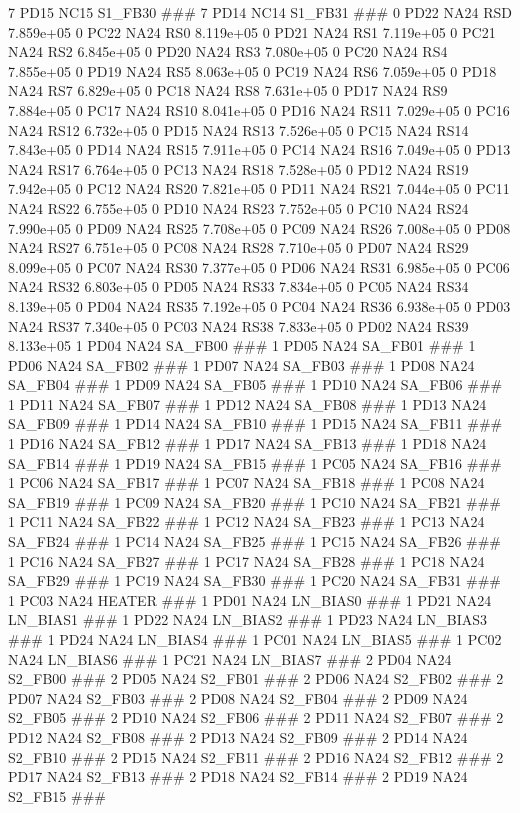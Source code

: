 7 PD15 NC15 S1_FB30 ### 
7 PD14 NC14 S1_FB31 ### 
0 PD22 NA24 RSD 7.859e+05 
0 PC22 NA24 RS0 8.119e+05 
0 PD21 NA24 RS1 7.119e+05 
0 PC21 NA24 RS2 6.845e+05 
0 PD20 NA24 RS3 7.080e+05 
0 PC20 NA24 RS4 7.855e+05 
0 PD19 NA24 RS5 8.063e+05 
0 PC19 NA24 RS6 7.059e+05 
0 PD18 NA24 RS7 6.829e+05 
0 PC18 NA24 RS8 7.631e+05 
0 PD17 NA24 RS9 7.884e+05 
0 PC17 NA24 RS10 8.041e+05 
0 PD16 NA24 RS11 7.029e+05 
0 PC16 NA24 RS12 6.732e+05 
0 PD15 NA24 RS13 7.526e+05 
0 PC15 NA24 RS14 7.843e+05 
0 PD14 NA24 RS15 7.911e+05 
0 PC14 NA24 RS16 7.049e+05 
0 PD13 NA24 RS17 6.764e+05 
0 PC13 NA24 RS18 7.528e+05 
0 PD12 NA24 RS19 7.942e+05 
0 PC12 NA24 RS20 7.821e+05 
0 PD11 NA24 RS21 7.044e+05 
0 PC11 NA24 RS22 6.755e+05 
0 PD10 NA24 RS23 7.752e+05 
0 PC10 NA24 RS24 7.990e+05 
0 PD09 NA24 RS25 7.708e+05 
0 PC09 NA24 RS26 7.008e+05 
0 PD08 NA24 RS27 6.751e+05 
0 PC08 NA24 RS28 7.710e+05 
0 PD07 NA24 RS29 8.099e+05 
0 PC07 NA24 RS30 7.377e+05 
0 PD06 NA24 RS31 6.985e+05 
0 PC06 NA24 RS32 6.803e+05 
0 PD05 NA24 RS33 7.834e+05 
0 PC05 NA24 RS34 8.139e+05 
0 PD04 NA24 RS35 7.192e+05 
0 PC04 NA24 RS36 6.938e+05 
0 PD03 NA24 RS37 7.340e+05 
0 PC03 NA24 RS38 7.833e+05 
0 PD02 NA24 RS39 8.133e+05 
1 PD04 NA24 SA_FB00 ### 
1 PD05 NA24 SA_FB01 ### 
1 PD06 NA24 SA_FB02 ### 
1 PD07 NA24 SA_FB03 ### 
1 PD08 NA24 SA_FB04 ### 
1 PD09 NA24 SA_FB05 ### 
1 PD10 NA24 SA_FB06 ### 
1 PD11 NA24 SA_FB07 ### 
1 PD12 NA24 SA_FB08 ### 
1 PD13 NA24 SA_FB09 ### 
1 PD14 NA24 SA_FB10 ### 
1 PD15 NA24 SA_FB11 ### 
1 PD16 NA24 SA_FB12 ### 
1 PD17 NA24 SA_FB13 ### 
1 PD18 NA24 SA_FB14 ### 
1 PD19 NA24 SA_FB15 ### 
1 PC05 NA24 SA_FB16 ### 
1 PC06 NA24 SA_FB17 ### 
1 PC07 NA24 SA_FB18 ### 
1 PC08 NA24 SA_FB19 ### 
1 PC09 NA24 SA_FB20 ### 
1 PC10 NA24 SA_FB21 ### 
1 PC11 NA24 SA_FB22 ### 
1 PC12 NA24 SA_FB23 ### 
1 PC13 NA24 SA_FB24 ### 
1 PC14 NA24 SA_FB25 ### 
1 PC15 NA24 SA_FB26 ### 
1 PC16 NA24 SA_FB27 ### 
1 PC17 NA24 SA_FB28 ### 
1 PC18 NA24 SA_FB29 ### 
1 PC19 NA24 SA_FB30 ### 
1 PC20 NA24 SA_FB31 ### 
1 PC03 NA24 HEATER ### 
1 PD01 NA24 LN_BIAS0 ### 
1 PD21 NA24 LN_BIAS1 ### 
1 PD22 NA24 LN_BIAS2 ### 
1 PD23 NA24 LN_BIAS3 ### 
1 PD24 NA24 LN_BIAS4 ### 
1 PC01 NA24 LN_BIAS5 ### 
1 PC02 NA24 LN_BIAS6 ### 
1 PC21 NA24 LN_BIAS7 ### 
2 PD04 NA24 S2_FB00 ### 
2 PD05 NA24 S2_FB01 ### 
2 PD06 NA24 S2_FB02 ### 
2 PD07 NA24 S2_FB03 ### 
2 PD08 NA24 S2_FB04 ### 
2 PD09 NA24 S2_FB05 ### 
2 PD10 NA24 S2_FB06 ### 
2 PD11 NA24 S2_FB07 ### 
2 PD12 NA24 S2_FB08 ### 
2 PD13 NA24 S2_FB09 ### 
2 PD14 NA24 S2_FB10 ### 
2 PD15 NA24 S2_FB11 ### 
2 PD16 NA24 S2_FB12 ### 
2 PD17 NA24 S2_FB13 ### 
2 PD18 NA24 S2_FB14 ### 
2 PD19 NA24 S2_FB15 ### 
